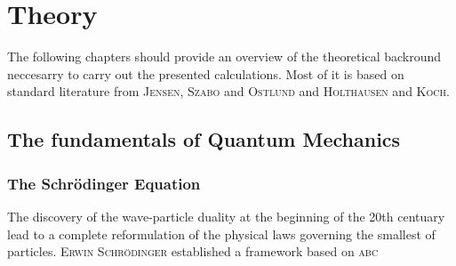 
\section{Theory}
\label{sec:theory}

The following chapters should provide an overview of the theoretical backround
neccesarry to carry out the presented calculations. Most of it is based on
standard literature from \textsc{Jensen}\autocite{jensen_introduction_2006}, \textsc{Szabo} and
\textsc{Ostlund}\autocite{} and \textsc{Holthausen} and
\textsc{Koch}\autocite{}.

\subsection{The fundamentals of Quantum Mechanics}
\label{sec:thefundamentalsofQM}

\subsubsection{The Schr\"odinger Equation}

The discovery of the wave-particle duality at the beginning of the 20th centuary lead to a complete reformulation of the physical laws governing the smallest of particles. \textsc{Erwin Schr\"odinger} established a framework based on \textsc{abc}

